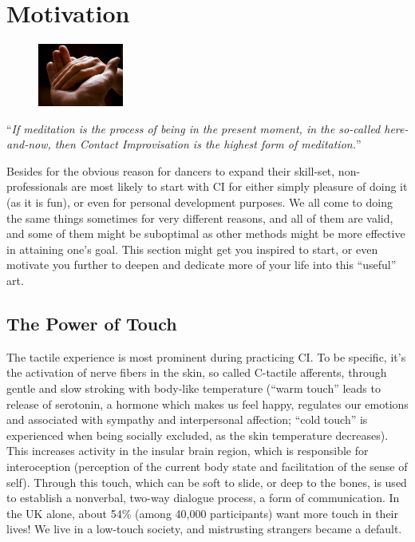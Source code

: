 \section{Motivation}\label{sec:motivation}

\begin{figure}
    \centering
    \includegraphics[width=0.25\textwidth]{images/motivation}
\end{figure}

``\textit{If meditation is the process of being in the present moment, in the so-called here-and-now, then Contact Improvisation is the highest form of meditation.}''

Besides for the obvious reason for dancers to expand their skill-set, non-professionals are most likely to start with CI for either simply pleasure of doing it (as it is fun), or even for personal development purposes.
We all come to doing the same things sometimes for very different reasons, and all of them are valid, and some of them might be suboptimal as other methods might be more effective in attaining one's goal.
This section might get you inspired to start, or even motivate you further to deepen and dedicate more of your life into this ``useful'' art.

\subsection{The Power of Touch}\label{subsec:the-power-of-touch}

The tactile experience is most prominent during practicing CI. To be specific, it's the activation of nerve fibers in the skin, so called C-tactile afferents, through gentle and slow stroking with body-like temperature (``warm touch'' leads to release of serotonin, a hormone which makes us feel happy, regulates our emotions and associated with sympathy and interpersonal affection; ``cold touch'' is experienced when being socially excluded, as the skin temperature decreases).
This increases activity in the insular brain region, which is responsible for interoception (perception of the current body state and facilitation of the sense of self).
Through this touch, which can be soft to slide, or deep to the bones, is used to establish a nonverbal, two-way dialogue process, a form of communication.
In the UK alone, about 54\% (among 40,000 participants) want more touch in their lives!
We live in a low-touch society, and mistrusting strangers became a default.

